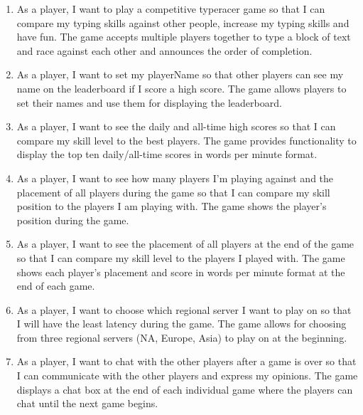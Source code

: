 \documentclass{article}
\begin{document}
\begin{enumerate}
	\item
	      As a player, I want to play a competitive typeracer game so that I can compare my typing skills against other people, increase my typing skills and have fun.
	      \subitem
	      The game accepts multiple players together to type a block of text and race against each other and announces the order of completion.

	\item
	      As a player, I want to set my playerName so that other players can see my name on the leaderboard if I score a high score.
	      \subitem
	      The game allows players to set their names and use them for displaying the leaderboard.

	\item
	      As a player, I want to see the daily and all-time high scores so that I can compare my skill level to the best players.
	      \subitem
	      The game provides functionality to display the top ten daily/all-time scores in words per minute format.

	\item
	      As a player, I want to see how many players I’m playing against and the placement of all players during the game so that I can compare my skill position to the players I am playing with.
	      \subitem
	      The game shows the player’s position during the game.

	\item
	      As a player, I want to see the placement of all players at the end of the game so that I can compare my skill level to the players I played with.
	      \subitem
	      The game shows each player’s placement and score in words per minute format at the end of each game.

	\item
	      As a player, I want to choose which regional server I want to play on so that I will have the least latency during the game.
	      \subitem
	      The game allows for choosing from three regional servers (NA, Europe, Asia) to play on at the beginning.

	\item
	      As a player, I want to chat with the other players after a game is over so that I can communicate with the other players and express my opinions.
	      \subitem
	      The game displays a chat box at the end of each individual game where the players can chat until the next game begins.
\end{enumerate}
\end{document}
